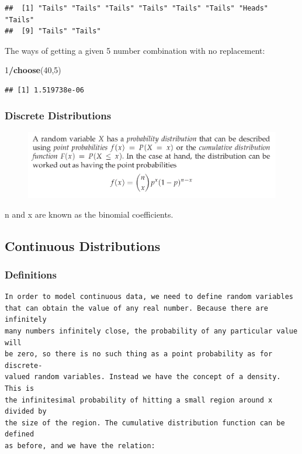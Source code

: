 \documentclass[]{article}
\newenvironment{Shaded}{\begin{snugshade}}{\end{snugshade}}
\newcommand{\KeywordTok}[1]{\textcolor[rgb]{0.13,0.29,0.53}{\textbf{#1}}}
\newcommand{\DecValTok}[1]{\textcolor[rgb]{0.00,0.00,0.81}{#1}}
\newcommand{\OperatorTok}[1]{\textcolor[rgb]{0.81,0.36,0.00}{\textbf{#1}}}
\newcommand{\NormalTok}[1]{#1}
\begin{document}
\begin{verbatim}
##  [1] "Tails" "Tails" "Tails" "Tails" "Tails" "Tails" "Heads" "Tails"
##  [9] "Tails" "Tails"
\end{verbatim}

The ways of getting a given 5 number combination with no replacement:

\begin{Shaded}
\begin{Highlighting}[]
\DecValTok{1}\OperatorTok{/}\KeywordTok{choose}\NormalTok{(}\DecValTok{40}\NormalTok{,}\DecValTok{5}\NormalTok{)}
\end{Highlighting}
\end{Shaded}

\begin{verbatim}
## [1] 1.519738e-06
\end{verbatim}

\subsubsection{Discrete Distributions}\label{discrete-distributions}

\begin{figure}
\centering
\includegraphics{img/discrete.png}
\caption{}
\end{figure}

n and x are known as the binomial coefficients.

\subsection{Continuous Distributions}\label{continuous-distributions}

\subsubsection{Definitions}\label{definitions}

\begin{verbatim}
In order to model continuous data, we need to define random variables
that can obtain the value of any real number. Because there are infinitely
many numbers infinitely close, the probability of any particular value will
be zero, so there is no such thing as a point probability as for discrete-
valued random variables. Instead we have the concept of a density. This is
the infinitesimal probability of hitting a small region around x divided by
the size of the region. The cumulative distribution function can be defined
as before, and we have the relation:
\end{verbatim}
\end{document}
